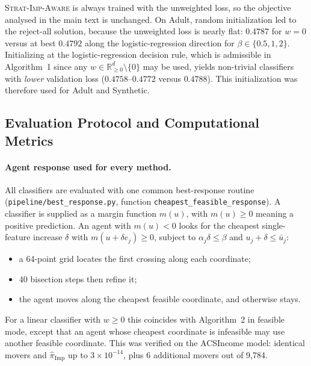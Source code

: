 \textsc{Strat-Imp-Aware} is always trained with the unweighted loss, so the
objective analysed in the main text is unchanged. On Adult, random
initialization led to the reject-all solution, because the unweighted loss is
nearly flat: $0.4787$ for $w=0$ versus at best $0.4792$ along the
logistic-regression direction for $\beta\in\{0.5,1,2\}$. Initializing at the
logistic-regression decision rule, which is admissible in Algorithm~1 since any
$w\in\mathbb{R}^d_{\ge 0}\setminus\{0\}$ may be used, yields non-trivial
classifiers with \emph{lower} validation loss ($0.4758$--$0.4772$ versus
$0.4788$). This initialization was therefore used for Adult and Synthetic.

\subsection{Evaluation Protocol and Computational Metrics}
\label{app:eval}

\paragraph{Agent response used for every method.}
All classifiers are evaluated with one common best-response routine
(\texttt{pipeline/best\_response.py}, function
\texttt{cheapest\_feasible\_response}). A classifier is supplied as a margin
function $m(u)$, with $m(u)\ge 0$ meaning a positive prediction. An agent with
$m(u)<0$ looks for the cheapest single-feature increase $\delta$ with
$m(u+\delta e_j)\ge 0$, subject to $\alpha_j\delta\le\beta$ and
$u_j+\delta\le\bar u_j$:
\begin{itemize}
  \item a 64-point grid locates the first crossing along each coordinate;
  \item 40 bisection steps then refine it;
  \item the agent moves along the cheapest feasible coordinate, and otherwise
        stays.
\end{itemize}
For a linear classifier with $w\ge 0$ this coincides with Algorithm~2 in
feasible mode, except that an agent whose cheapest coordinate is infeasible may
use another feasible coordinate. This was verified on the ACSIncome model:
identical movers and $\widehat{\pi}_{\mathrm{Imp}}$ up to $3\times10^{-14}$,
plus 6 additional movers out of 9{,}784.

